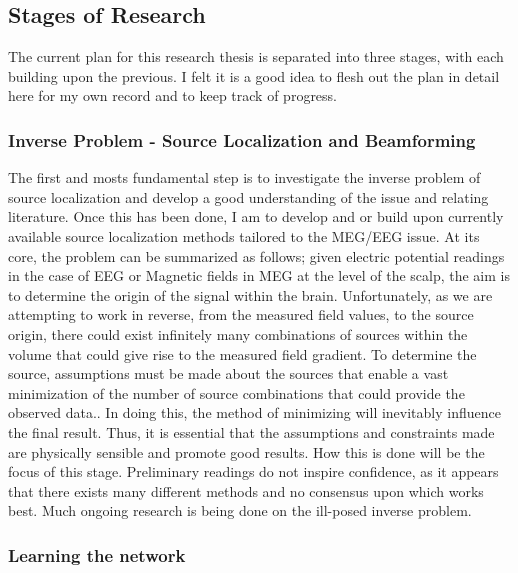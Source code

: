 \documentclass{article}
\begin{document}
\subsection{Stages of Research}
The current plan for this research thesis is separated into three stages, with each building upon the previous. I felt it is a good idea to flesh out the plan in detail here for my own record and to keep track of progress.
\subsubsection{Inverse Problem - Source Localization and Beamforming}
The first and mosts fundamental step is to investigate the inverse problem of source localization and develop a good understanding of the issue and relating literature. Once this has been done, I am to develop and or build upon currently available source localization methods tailored to the MEG/EEG issue. At its core, the problem can be summarized as follows; given electric potential readings in the case of EEG or Magnetic fields in MEG at the level of the scalp, the aim is to determine the origin of the signal within the brain. Unfortunately, as we are attempting to work in reverse, from the measured field values, to the source origin, there could exist infinitely many combinations of sources within the volume that could give rise to the measured field gradient. To determine the source, assumptions must be made about the sources that enable a vast minimization of the number of source combinations that could provide the observed data.. In doing this, the method of minimizing will inevitably influence the final result. Thus, it is essential that the assumptions and constraints made are physically sensible and promote good results. How this is done will be the focus of this stage. Preliminary readings do not inspire confidence, as it appears that there exists many different methods and no consensus upon which works best. Much ongoing research is being done on the ill-posed inverse problem.

\subsubsection{Learning the network}

 
\end{document}
